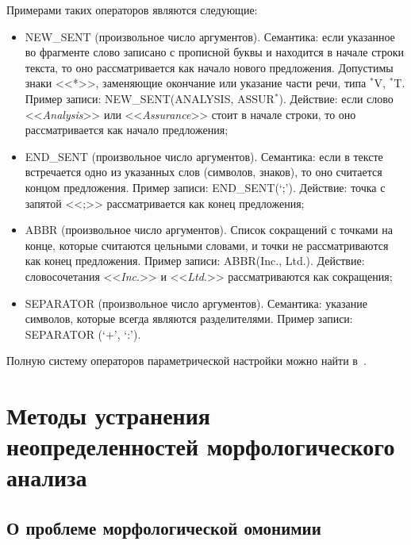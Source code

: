 \begin{multicols}{2}
Примерами таких операторов являются следу\-ющие:
     \begin{itemize}
     \item NEW\_SENT (произвольное число аргументов). Семантика: если указанное 
во фрагменте слово записано с прописной буквы и находится в начале строки 
текста, то оно рассматривается как начало нового предложения. Допустимы 
знаки <<*>>, заменяющие окончание или указание части речи, типа 
$^*$V, $^*$T. Пример записи: NEW\_SENT(ANALYSIS, ASSUR$^*$). 
Действие: если слово <<\textit{Analysis}>> или <<\textit{Assurance}>> стоит в 
начале строки, то оно рассматривается как начало предложения;
\item  END\_SENT (произвольное число аргументов). Семантика: если в тексте 
встречается одно из указанных слов (символов, знаков), то оно считается 
концом предложения. Пример записи: END\_SENT(`;'). Действие: точка с 
запятой <<;>> рассматривается как конец предложения;
\item ABBR (произвольное число аргументов). Список сокращений с точками на 
конце, которые считаются цельными словами, и точки не рас\-смат\-ри\-ва\-ют\-ся как 
конец предложения. Пример записи: ABBR(Inc., Ltd.). Действие: 
словосочетания <<\textit{Inc}.>> и <<\textit{Ltd}.>> рассматриваются как 
сокращения; 
\item  SEPARATOR (произвольное число аргументов). Семантика: указание символов, 
которые всегда являются разделителями. Пример записи: \mbox{SEPARATOR} (`+', 
`:').
\end{itemize}

     Полную систему операторов параметрической настройки можно найти 
в~\cite{13kuz}.

\section{Методы устранения неопределенностей морфологического 
анализа}

\vspace*{-6pt}

\subsection{О проблеме морфологической омонимии} 
     

\end{multicols}
